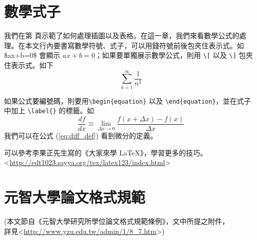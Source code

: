 \chapter{數學式子}
我們在第 \pageref{ch:example} 頁示範了如何處理插圖以及表格。在這一章，我們來看數學公式的處理。在本文行內要書寫數學符號、式子，可以用錢符號前後包夾住表示式。如 \$ax+b=0\$ 會顯示 $ax+b=0$；如果要單獨展示數學公式，則用 \verb+\[+ 以及 \verb+\]+ 包夾住表示式。如下
\[
\sum_{k=1}^{\infty}\frac{1}{n^2}
\]

如果公式要編號碼，則要用\verb+\begin{equation}+ 以及 \verb+\end{equation}+，並在式子中加上 \verb+\label{}+ 的標籤。如
\begin{equation}
  \frac{df}{dx} \equiv \lim_{\Delta x \rightarrow 0} \frac{f(x+\Delta x) - f(x)}{\Delta x}   \label{eq:diff_def}
\end{equation}
我們可以在公式 (\ref{eq:diff_def}) 看到微分的定義。

可以參考李果正先生寫的《大家來學 {\LaTeX}》，學習更多的技巧。\\
\textless{}\url{http://edt1023.sayya.org/tex/latex123/index.html}\textgreater{}

\chapter{元智大學論文格式規範}
(本文節自《元智大學研究所學位論文格式規範條例》，文中所提之附件，\\
詳見\textless{}\url{http://www.yzu.edu.tw/admin/1/8_7.htm}\textgreater{})

